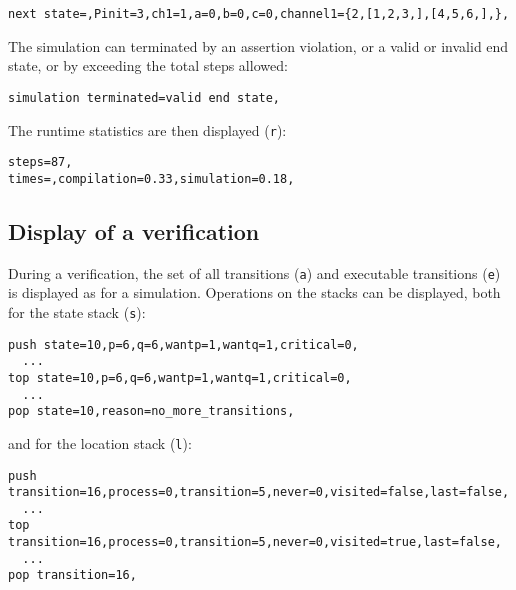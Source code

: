 \documentclass[11pt]{article}
\newcommand*{\p}[1]{\texttt{#1}}
\begin{document}
\begin{footnotesize}
\begin{verbatim}
next state=,Pinit=3,ch1=1,a=0,b=0,c=0,channel1={2,[1,2,3,],[4,5,6,],},
\end{verbatim}
\end{footnotesize}

The simulation can terminated by an assertion violation, or a valid or
invalid end state, or by exceeding the total steps allowed:

\begin{footnotesize}
\begin{verbatim}
simulation terminated=valid end state,
\end{verbatim}
\end{footnotesize}

The runtime statistics are then displayed (\p{r}):

\begin{footnotesize}
\begin{verbatim}
steps=87,
times=,compilation=0.33,simulation=0.18,
\end{verbatim}
\end{footnotesize}

\subsection{Display of a verification}
During a verification, the set of all transitions (\p{a}) and executable
transitions (\p{e}) is displayed as for a simulation. Operations on the
stacks can be displayed, both for the state stack (\p{s}):

\begin{footnotesize}
\begin{verbatim}
push state=10,p=6,q=6,wantp=1,wantq=1,critical=0,
  ...
top state=10,p=6,q=6,wantp=1,wantq=1,critical=0,
  ...
pop state=10,reason=no_more_transitions,
\end{verbatim}
\end{footnotesize}

and for the location stack (\p{l}):

\begin{footnotesize}
\begin{verbatim}
push transition=16,process=0,transition=5,never=0,visited=false,last=false,
  ...
top transition=16,process=0,transition=5,never=0,visited=true,last=false,
  ...
pop transition=16,
\end{verbatim}
\end{footnotesize}
\end{document}
